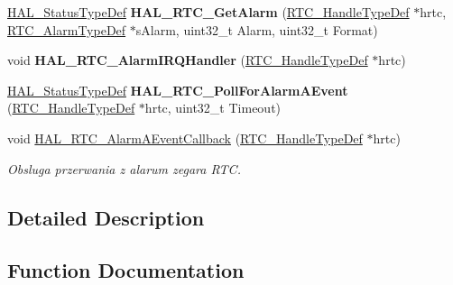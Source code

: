 \begin{DoxyCompactItemize}
\hyperlink{stm32f4xx__hal__def_8h_a63c0679d1cb8b8c684fbb0632743478f}{H\+A\+L\+\_\+\+Status\+Type\+Def} {\bfseries H\+A\+L\+\_\+\+R\+T\+C\+\_\+\+Get\+Alarm} (\hyperlink{struct_r_t_c___handle_type_def}{R\+T\+C\+\_\+\+Handle\+Type\+Def} $\ast$hrtc, \hyperlink{struct_r_t_c___alarm_type_def}{R\+T\+C\+\_\+\+Alarm\+Type\+Def} $\ast$s\+Alarm, uint32\+\_\+t Alarm, uint32\+\_\+t Format)
\item 
\mbox{\label{group___r_t_c___exported___functions___group3_gac185f2ce34fe566418d0978a48e0c199}} 
void {\bfseries H\+A\+L\+\_\+\+R\+T\+C\+\_\+\+Alarm\+I\+R\+Q\+Handler} (\hyperlink{struct_r_t_c___handle_type_def}{R\+T\+C\+\_\+\+Handle\+Type\+Def} $\ast$hrtc)
\item 
\mbox{\label{group___r_t_c___exported___functions___group3_gaedc27fe412f45d999d74a0b98dce4d09}} 
\hyperlink{stm32f4xx__hal__def_8h_a63c0679d1cb8b8c684fbb0632743478f}{H\+A\+L\+\_\+\+Status\+Type\+Def} {\bfseries H\+A\+L\+\_\+\+R\+T\+C\+\_\+\+Poll\+For\+Alarm\+A\+Event} (\hyperlink{struct_r_t_c___handle_type_def}{R\+T\+C\+\_\+\+Handle\+Type\+Def} $\ast$hrtc, uint32\+\_\+t Timeout)
\item 
void \hyperlink{group___r_t_c___exported___functions___group3_ga11aeff83fd498cddbed3bcddcf017e0a}{H\+A\+L\+\_\+\+R\+T\+C\+\_\+\+Alarm\+A\+Event\+Callback} (\hyperlink{struct_r_t_c___handle_type_def}{R\+T\+C\+\_\+\+Handle\+Type\+Def} $\ast$hrtc)
\begin{DoxyCompactList}\small\item\em Obsluga przerwania z alarum zegara R\+TC. \end{DoxyCompactList}\end{DoxyCompactItemize}


\subsection{Detailed Description}


\subsection{Function Documentation}
\mbox{\label{group___r_t_c___exported___functions___group3_ga11aeff83fd498cddbed3bcddcf017e0a}} 
